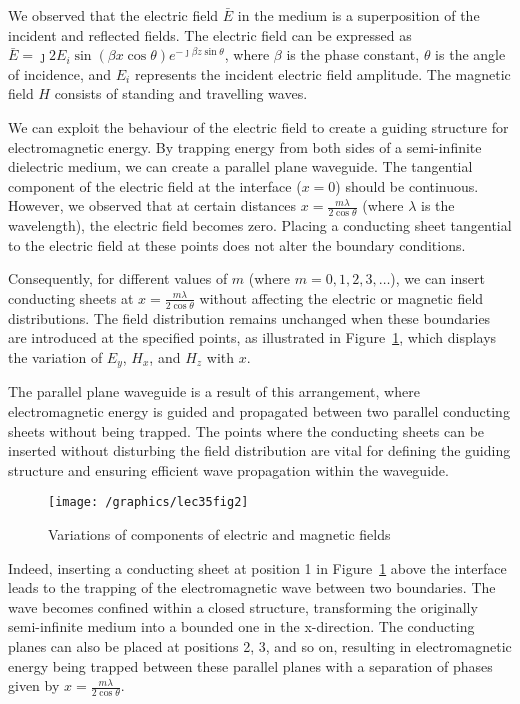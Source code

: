 We observed that the electric field $\bar{E}$ in the medium is a superposition of the incident and reflected fields. The electric field can be expressed as $\bar{E} = \jmath 2E_i\sin(\beta x\cos\theta)e^{-\jmath\beta z\sin\theta}$, where $\beta$ is the phase constant, $\theta$ is the angle of incidence, and $E_i$ represents the incident electric field amplitude. The magnetic field $H$ consists of standing and travelling waves.

We can exploit the behaviour of the electric field to create a guiding structure for electromagnetic energy. By trapping energy from both sides of a semi-infinite dielectric medium, we can create a parallel plane waveguide. The tangential component of the electric field at the interface ($x=0$) should be continuous. However, we observed that at certain distances $x=\frac{m\lambda}{2\cos\theta}$ (where $\lambda$ is the wavelength), the electric field becomes zero. Placing a conducting sheet tangential to the electric field at these points does not alter the boundary conditions.

Consequently, for different values of $m$ (where $m=0, 1, 2, 3, \ldots$), we can insert conducting sheets at $x=\frac{m\lambda}{2\cos\theta}$ without affecting the electric or magnetic field distributions. The field distribution remains unchanged when these boundaries are introduced at the specified points, as illustrated in Figure~\ref{fig:lec35fig2}, which displays the variation of $E_y$, $H_x$, and $H_z$ with $x$.

The parallel plane waveguide is a result of this arrangement, where electromagnetic energy is guided and propagated between two parallel conducting sheets without being trapped. The points where the conducting sheets can be inserted without disturbing the field distribution are vital for defining the guiding structure and ensuring efficient wave propagation within the waveguide.
\begin{figure}[h]
\centering
\texttt{[image: /graphics/lec35fig2]}
\caption{Variations of components of electric and magnetic fields}
\label{fig:lec35fig2}
\end{figure}

Indeed, inserting a conducting sheet at position 1 in Figure~\ref{fig:lec35fig2} above the interface leads to the trapping of the electromagnetic wave between two boundaries. The wave becomes confined within a closed structure, transforming the originally semi-infinite medium into a bounded one in the x-direction. The conducting planes can also be placed at positions 2, 3, and so on, resulting in electromagnetic energy being trapped between these parallel planes with a separation of phases given by $x=\frac{m\lambda}{2\cos\theta}$.

